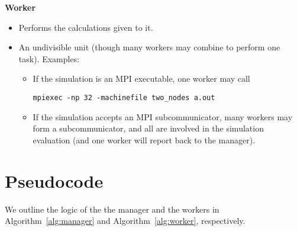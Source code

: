 \documentclass{article}
\newcommand{\algref}[1]{{\rm Algorithm}~\ref{alg:#1}}
\begin{document}
\noindent \textbf{Worker}
\begin{itemize}
  \item Performs the calculations given to it.
  \item An undivisible unit (though many workers may combine to perform one task). Examples:
    \begin{itemize}
      \item If the simulation is an MPI executable, one worker may call
        \begin{center}
          \texttt{mpiexec -np 32 -machinefile two\_nodes a.out}
        \end{center}
      \item If the simulation accepts an MPI subcommunicator, many workers may
        form a subcommunicator, and all are involved in the simulation
        evaluation (and one worker will report back to the manager).
    \end{itemize}
\end{itemize}

\section{Pseudocode}

We outline the logic of the the manager and the workers in \algref{manager} and \algref{worker}, respectively.
\end{document}
